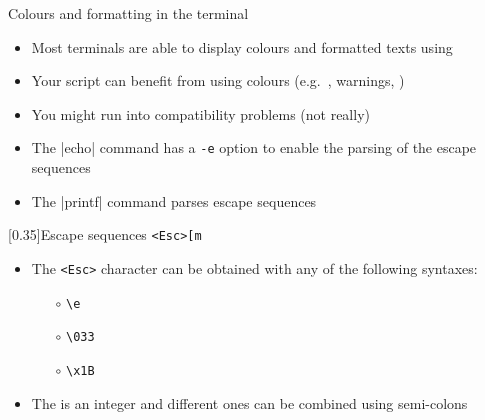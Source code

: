 
\begin{frame}{Colours and formatting in the terminal}{}
    \vspace{-4mm}
    \begin{itemize}
        \item Most terminals are able to display colours and formatted texts using 
        \item Your script can benefit from using colours (e.g.\ , \alert{warnings}, )
        \item You might run into compatibility problems (not really) {\scriptsize $\;$ }
        \item The \bash|echo| command has a \texttt{\alert{-e}} option to enable the parsing of the escape sequences
        \item The \bash|printf| command parses escape sequences
    \end{itemize}
    \vspace{-3mm}
    \begin{varblock}{}[0.35\textwidth]{Escape sequences}
        \texttt{<Esc>[m}
    \end{varblock}
    \begin{itemize}
        \item The \texttt{<Esc>} character can be obtained with any of the following syntaxes:
              \begin{itemize}
                  \item[$\circ$] \texttt{\textbackslash{}e}
                  \item[$\circ$] \texttt{\textbackslash{}033}
                  \item[$\circ$] \texttt{\textbackslash{}x1B}
              \end{itemize}
        \item The \texttt{} is an integer and different ones can be combined using semi-colons
    \end{itemize}
\end{frame}
